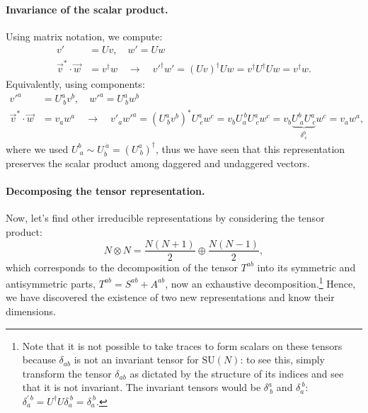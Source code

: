 \paragraph{Invariance of the scalar product.}
Using matrix notation, we compute:
\[
    \begin{aligned}
        v'                      & = U v, \quad w' = U w                                                                                            \\
        \vec{v}^* \cdot \vec{w} & = v^\dagger w \quad \rightarrow \quad v'^\dagger w' = (U v)^\dagger U w = v^\dagger U^\dagger U w = v^\dagger w.
    \end{aligned}
\]
Equivalently, using components:
\[
    \begin{aligned}
        v'^a                    & = U^a_{\ b} v^b, \quad w'^a = U^a_{\ b} w^b                                                                                                                                          \\
        \vec{v}^* \cdot \vec{w} & = v_a w^a \quad \rightarrow \quad v'_a w'^a = (U^a_{\ b} v^b)^* U^a_{\ c} w^c = v_b U^{\ b}_{a} U^a_{\ c} w^c = v_b \underbrace{U^b_{\ a} U^a_{\ c}}_{\delta^b_{\ c}} w^c = v_a w^a,
    \end{aligned}
\]
where we used \(U^b_{\ a} \sim U_{\dot{b}}^{\ \dot{a}} = (U^a_{\ b})^\dagger\), thus we have seen that this representation preserves the scalar product among daggered and undaggered vectors.

\paragraph{Decomposing the tensor representation.}
Now, let's find other irreducible representations by considering the tensor product:
\[
    N \otimes N = \frac{N(N+1)}{2} \oplus \frac{N(N-1)}{2},
\]
which corresponds to the decomposition of the tensor \(T^{ab}\) into its symmetric and antisymmetric parts, \(T^{ab} = S^{ab} + A^{ab}\), now an exhaustive decomposition.\footnote{Note that it is not possible to take traces to form scalars on these tensors because \(\delta_{ab}\) is not an invariant tensor for \(\mathrm{SU}(N)\): to see this, simply transform the tensor \(\delta_{ab}\) as dictated by the structure of its indices and see that it is not invariant. The invariant tensors would be \(\delta^a_{\ b}\) and \(\delta_a^{\ b}\): \(\delta_a^{\prime \, b} = U^{\dagger}U \delta_a^{\ b} = \delta_a^{\ b}\).} Hence, we have discovered the existence of two new representations and know their dimensions.

